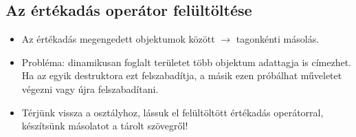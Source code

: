 \documentclass[usenames,dvipsnames,aspectratio=169]{beamer}
\begin{document}
\subsection{Az értékadás operátor felültöltése}

\begin{frame}
    \begin{itemize}
        \item Az értékadás megengedett objektumok között $\to$ tagonkénti másolás.
        \item Probléma: dinamikusan foglalt területet több objektum adattagja is címezhet. Ha az egyik destruktora ezt felszabadítja, a másik ezen próbálhat műveletet végezni vagy újra felszabadítani.
        \item Térjünk vissza a  osztályhoz, lássuk el felültöltött értékadás operátorral, készítsünk másolatot a tárolt szövegről!
    \end{itemize}
\end{frame}

\begin{frame}
    \begin{exampleblock}{}
        \footnotesize
        
    \end{exampleblock}
\end{frame}

\begin{frame}
    \begin{exampleblock}{}
        \scriptsize
        
    \end{exampleblock}
\end{frame}

\begin{frame}
    \begin{exampleblock}{}
        \small
        
    \end{exampleblock}
\end{frame}
\end{document}
